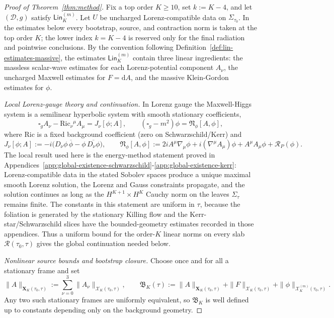 \documentclass[11pt]{article}
\numberwithin{equation}{section}
\theoremstyle{plain}
\theoremstyle{definition}
\theoremstyle{remark}
\newcommand{\dd}{\mathrm{d}}
\newcommand{\Lin}{\mathsf{Lin}}
\begin{document}
\begin{proof}[Proof of Theorem~\ref{thm:method}]
Fix a top order $K\ge10$, set $k:=K-4$, and let $(\mathcal D,g)$ satisfy $\Lin_{K}^{(m)}$. Let $U$ be uncharged Lorenz-compatible data on $\Sigma_{\tau_{0}}$. In the estimates below every bootstrap, source, and contraction norm is taken at the top order $K$; the lower index $k=K-4$ is reserved only for the final radiation and pointwise conclusions. By the convention following Definition~\ref{def:lin-estimates-massive}, the estimates $\Lin_{K}^{(m)}$ contain three linear ingredients: the massless scalar-wave estimates for each Lorenz-potential component $A_{\nu}$, the uncharged Maxwell estimates for $F=\dd A$, and the massive Klein-Gordon estimates for $\phi$.

\smallskip
\noindent\emph{Local Lorenz-gauge theory and continuation.}
In Lorenz gauge the Maxwell-Higgs system is a semilinear hyperbolic system with smooth stationary coefficients,
\begin{equation}\label{eq:method-lorenz-reduced}
\square_{g}A_{\nu}-\mathrm{Ric}_{\nu}{}^{\mu}A_{\mu}=J_{\nu}[\phi;A],
\qquad
(\square_{g}-m^{2})\phi=\mathfrak N_{\phi}[A,\phi],
\end{equation}
where $\mathrm{Ric}$ is a fixed background coefficient (zero on Schwarzschild/Kerr) and
\begin{equation}
J_{\nu}[\phi;A]
:=
-i\bigl(D_{\nu}\phi\,\overline{\phi}-\phi\,\overline{D_{\nu}\phi}\bigr),
\qquad
\mathfrak N_{\phi}[A,\phi]
:=
2iA^{\mu}\nabla_{\mu}\phi+i(\nabla^{\mu}A_{\mu})\phi+A^{\mu}A_{\mu}\phi+\mathcal R_{P}(\phi).
\end{equation}
The local result used here is the energy-method statement proved in Appendices~\ref{app:global-existence-schwarzschild}-\ref{app:global-existence-kerr}: Lorenz-compatible data in the stated Sobolev spaces produce a unique maximal smooth Lorenz solution, the Lorenz and Gauss constraints propagate, and the solution continues as long as the \(H^{K+1}\times H^{K}\) Cauchy norm on the leaves \(\Sigma_\tau\) remains finite.  The constants in this statement are uniform in \(\tau\), because the foliation is generated by the stationary Killing flow and the Kerr-star/Schwarzschild slices have the bounded-geometry estimates recorded in those appendices.  Thus a uniform bound for the order-\(K\) linear norms on every slab \(\mathcal R(\tau_0,\tau)\) gives the global continuation needed below.

\smallskip
\noindent\emph{Nonlinear source bounds and bootstrap closure.}
Choose once and for all a stationary frame and set
\begin{equation}
\|A\|_{\mathbf X_{K}(\tau_{0},\tau)}
:=
\sum_{\nu=0}^{3}\|A_{\nu}\|_{\mathcal X_{K}(\tau_{0},\tau)},
\qquad
\mathfrak B_{K}(\tau)
:=
\|A\|_{\mathbf X_{K}(\tau_{0},\tau)}
+\|F\|_{\mathcal X_{K}(\tau_{0},\tau)}
+\|\phi\|_{\mathcal X_{K}^{(m)}(\tau_{0},\tau)}.
\end{equation}
Any two such stationary frames are uniformly equivalent, so $\mathfrak B_{K}$ is well defined up to constants depending only on the background geometry.


\end{proof}
\end{document}
